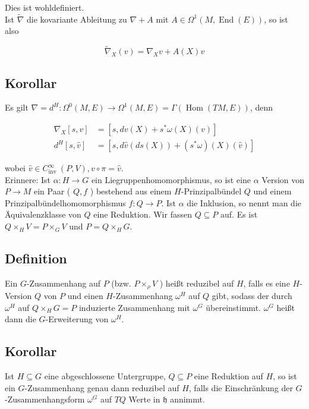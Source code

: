 \documentclass[10pt, letterpaper]{article}
\begin{document}
Dies ist wohldefiniert.\\
Ist $\tilde{\nabla}$ die kovariante Ableitung zu $\nabla+A$ mit $A \in \Omega^{1}(M, \operatorname{End}(E))$, so ist also

$$
\tilde{\nabla}_{X}(v)=\nabla_{X} v+A(X) v
$$

\subsection*{Korollar}
Es gilt $\nabla=d^{H}: \Omega^{0}(M, E) \rightarrow \Omega^{1}(M, E)=\Gamma(\operatorname{Hom}(T M, E))$, denn

$$
\begin{aligned}
\nabla_{X}[s, v] & =\left[s, d v(X)+s^{*} \omega(X)(v)\right] \\
d^{H}[s, \hat{v}] & =\left[s, d \hat{v}(d s(X))+\left(s^{*} \omega\right)(X)(\hat{v})\right]
\end{aligned}
$$

wobei $\hat{v} \in C_{\text {inv }}^{\infty}(P, V), v \circ \pi=\hat{v}$.\\
Erinnere: Ist $\alpha: H \rightarrow G$ ein Liegruppenhomomorphismus, so ist eine $\alpha$ Version von $P \rightarrow M$ ein Paar ( $Q, f$ ) bestehend aus einem $H$-Prinzipalbündel $Q$ und einem Prinzipalbündelhomomorphismus $f: Q \rightarrow P$. Ist $\alpha$ die Inklusion, so nennt man die Äquivalenzklasse von $Q$ eine Reduktion. Wir fassen $Q \subseteq P$ auf. Es ist $Q \times_{H} V=P \times_{G} V$ und $P=Q \times_{H} G$.

\subsection*{Definition}
Ein $G$-Zusammenhang auf $P$ (bzw. $P \times_{\rho} V$ ) heißt reduzibel auf $H$, falls es eine $H$-Version $Q$ von $P$ und einen $H$-Zusammenhang $\omega^{H}$ auf $Q$ gibt, sodass der durch $\omega^{H}$ auf $Q \times_{H} G=P$ induzierte Zusammenhang mit $\omega^{G}$ übereinstimmt. $\omega^{G}$ heißt dann die $G$-Erweiterung von $\omega^{H}$.

\subsection*{Korollar}
Ist $H \subseteq G$ eine abgeschlossene Untergruppe, $Q \subseteq P$ eine Reduktion auf $H$, so ist ein $G$-Zusammenhang genau dann reduzibel auf $H$, falls die Einschränkung der $G$-Zusammenhangsform $\omega^{G}$ auf $T Q$ Werte in $\mathfrak{h}$ annimmt.
\end{document}
